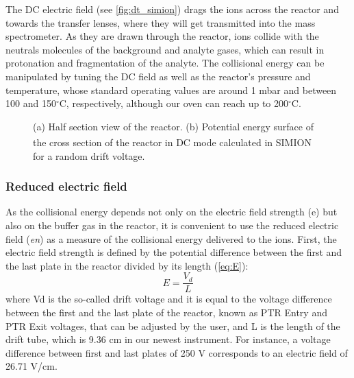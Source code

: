 The DC electric field (see \autoref{fig:dt_simion}) drags the ions across the reactor and towards the transfer lenses, where they will get transmitted into the mass spectrometer. As they are drawn through the reactor, ions collide with the neutrals molecules of the background and analyte gases, which can result in protonation and fragmentation of the analyte. The collisional energy can be manipulated by tuning the DC field as well as the reactor's pressure and temperature, whose standard operating values are around 1 mbar and between 100 and 150$^{\circ}$C, respectively, although our oven can reach up to 200$^{\circ}$C.




\begin{figure}[t]
\centering
{}
\centering
\caption{(a) Half section view of the reactor. (b) Potential energy surface of the cross section of the reactor in DC mode calculated in SIMION\textsuperscript{\textregistered} for a random drift voltage.}
\label{fig:dt_simion}
\end{figure}




\subsubsection{Reduced electric field}
As the collisional energy depends not only on the electric field strength (\acrshort{e}) but also on the buffer gas in the reactor, it is convenient to use the reduced electric field (\textit{\acrshort{en}}) as a measure of the collisional energy delivered to the ions.
First, the electric field strength  is defined by the potential difference between the first and the last plate in the reactor divided by its length (\autoref{eq:E}):
\begin{equation}
E = \frac{V_d}{L}
\label{eq:E}
\end{equation}
where \acrshort{Vd} is the so-called drift voltage and it is equal to the voltage difference between the first and the last plate of the reactor, known as PTR Entry and PTR Exit voltages,
that can be adjusted by the user, and L is the length of the drift tube, which is 9.36 cm in our newest instrument.
For instance, a voltage difference between first and last plates of 250 V corresponds to an electric field of 26.71 V/cm.

